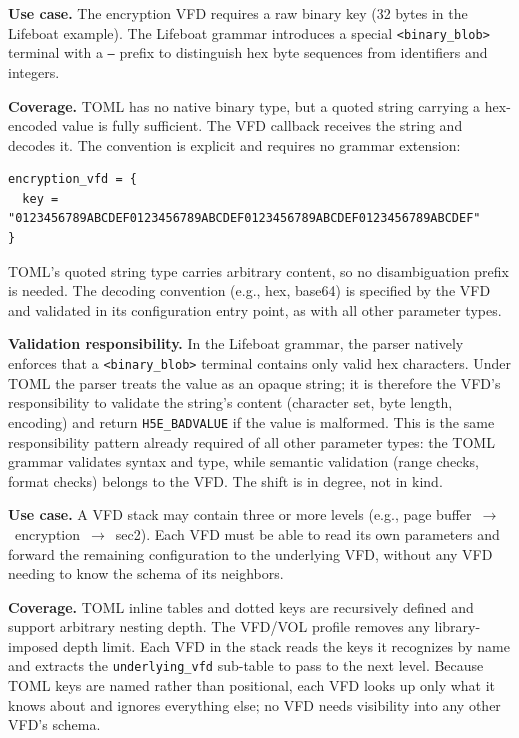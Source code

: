 \documentclass[../RFC-HDFG-2026-001.tex]{subfiles}
\begin{document}
\textbf{Use case.}  The encryption VFD requires a raw binary key (32 bytes in
the Lifeboat example).  The Lifeboat grammar introduces a special
\texttt{<binary\_blob>} terminal with a \texttt{--} prefix to distinguish hex
byte sequences from identifiers and integers.

\textbf{Coverage.}  TOML has no native binary type, but a quoted
string carrying a hex-encoded value is fully sufficient.  The VFD callback
receives the string and decodes it.  The convention is explicit and requires no
grammar extension:

\begin{verbatim}
encryption_vfd = {
  key = "0123456789ABCDEF0123456789ABCDEF0123456789ABCDEF0123456789ABCDEF"
}
\end{verbatim}

TOML's quoted string type carries arbitrary content, so no disambiguation
prefix is needed.  The decoding convention (e.g., hex, base64) is specified
by the VFD and validated in its configuration entry point, as with all other
parameter types.

\textbf{Validation responsibility.}  In the Lifeboat grammar, the parser
natively enforces that a \texttt{<binary\_blob>} terminal contains only valid
hex characters.  Under TOML the parser treats the value as an opaque string;
it is therefore the VFD's responsibility to validate the string's content
(character set, byte length, encoding) and return \texttt{H5E\_BADVALUE} if
the value is malformed.  This is the same responsibility pattern already
required of all other parameter types: the TOML grammar validates syntax and
type, while semantic validation (range checks, format checks) belongs to the
VFD.  The shift is in degree, not in kind.


\textbf{Use case.}  A VFD stack may contain three or more levels (e.g.,
page buffer~$\to$~encryption~$\to$~sec2).  Each VFD must be able to read its
own parameters and forward the remaining configuration to the underlying VFD,
without any VFD needing to know the schema of its neighbors.

\textbf{Coverage.}  TOML inline tables and dotted keys are
recursively defined and support arbitrary nesting depth.  The VFD/VOL profile
removes any library-imposed depth limit.  Each VFD in the stack reads the
keys it recognizes by name and extracts the \texttt{underlying\_vfd} sub-table
to pass to the next level.  Because TOML keys are named rather than
positional, each VFD looks up only what it knows about and ignores everything
else; no VFD needs visibility into any other VFD's schema.
\end{document}
